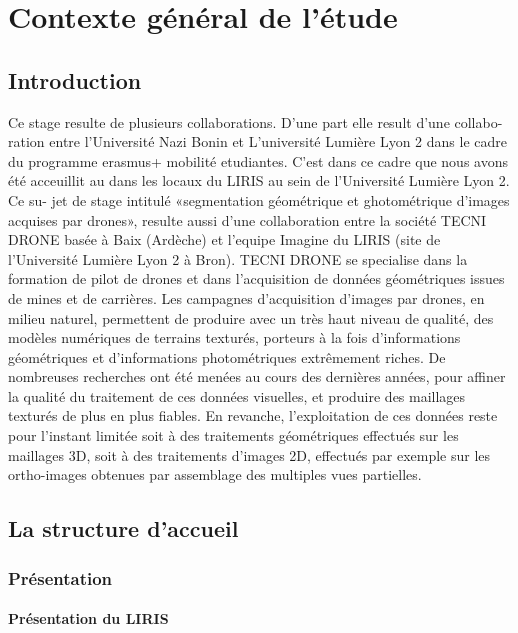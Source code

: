 \chapter{Contexte général de l'étude}

\section*{Introduction}
Ce stage resulte de plusieurs collaborations. D’une part elle result d’une collabo-
ration entre l’Université Nazi Bonin et L’université Lumière Lyon 2 dans le cadre du
programme erasmus+ mobilité etudiantes. C’est dans ce cadre que nous avons été
acceuillit au dans les locaux du LIRIS au sein de l’Université Lumière Lyon 2. Ce su-
jet de stage intitulé «segmentation géométrique et ghotométrique d’images acquises
par drones», resulte aussi d’une collaboration entre la société TECNI DRONE basée
à Baix (Ardèche) et l’equipe Imagine du LIRIS (site de l’Université Lumière Lyon
2 à Bron). TECNI DRONE se specialise dans la formation de pilot de drones et dans
l’acquisition de données géométriques issues de mines et de carrières. Les campagnes
d’acquisition d’images par drones, en milieu naturel, permettent de produire avec un
très haut niveau de qualité, des modèles numériques de terrains texturés, porteurs à
la fois d’informations géométriques et d’informations photométriques extrêmement
riches. De nombreuses recherches ont été menées au cours des dernières années, pour
affiner la qualité du traitement de ces données visuelles, et produire des maillages
texturés de plus en plus fiables. En revanche, l’exploitation de ces données reste pour
l’instant limitée soit à des traitements géométriques effectués sur les maillages 3D,
soit à des traitements d’images 2D, effectués par exemple sur les ortho-images obtenues 
par assemblage des multiples vues partielles.

\section{La structure d'accueil}

\subsection{Présentation }

 \subsubsection{Présentation du LIRIS}

